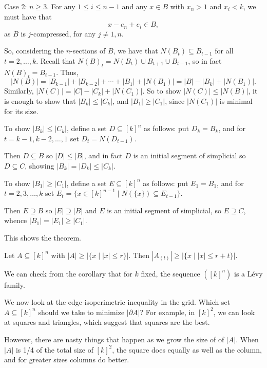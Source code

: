 \documentclass[12pt]{article}
\begin{document}
\begin{proofbox}
	Case 2: $n \geq 3$. For any $1 \leq i \leq n-1$ and any $x \in B$ with $x_n > 1$ and $x_i < k$, we must have that
	\[
	x - e_n + e_i \in B,
	\]
	as $B$ is $j$-compressed, for any $j \neq 1, n$.

	So, considering the $n$-sections of $B$, we have that $N(B_t) \subseteq B_{t-1}$ for all $t = 2, \ldots, k$. Recall that $N(B)_t = N(B_t) \cup B_{t+1} \cup B_{t-1}$, so in fact $N(B)_t = B_{t-1}$. Thus,
	\[
	|N(B)| = |B_{k-1}| + |B_{k-2}| + \cdots + |B_1| + |N(B_1)| = |B| - |B_k| + |N(B_1)|.
	\]
	Similarly, $|N(C)| = |C| - |C_k| + |N(C_1)|$. So to show $|N(C)| \leq |N(B)|$, it is enough to show that $|B_k| \leq |C_k|$, and $|B_1| \geq |C_1|$, since $|N(C_1)|$ is minimal for its size.

	To show $|B_k| \leq |C_k|$, define a set $D \subseteq [k]^{n}$  as follows: put $D_k = B_k$, and for $t = k-1, k-2, \ldots, 1$ set $D_t = N(D_{t-1})$.

	Then $D \subseteq B$ so $|D| \leq |B|$, and in fact $D$ is an initial segment of simplicial so $D \subseteq C$, showing $|B_k| = |D_k| \leq |C_k|$.

	To show $|B_1| \geq |C_1|$, define a set $E \subseteq [k]^{n}$ as follows: put $E_1 = B_1$, and for $t = 2, 3, \ldots, k$ set $E_t = \{x \in [k]^{n-1} \mid N(\{x\}) \subseteq E_{t-1}\}$.

	Then $E \supseteq B$ so $|E| \supseteq |B|$ and $E$ is an initial segment of simplicial, so $E \supseteq C$, whence $|B_1| = |E_1| \geq |C_1|$.

	This shows the theorem.
\end{proofbox}

\begin{corollary}
	Let $A \subseteq [k]^{n}$ with $|A| \geq |\{x \mid |x| \leq r\}|$. Then $|A_{(t)}| \geq |\{x \mid |x| \leq r + t\}|$.
\end{corollary}

\begin{remark}
	We can check from the corollary that for $k$ fixed, the sequence $([k]^{n})$ is a L\'evy family.
\end{remark}

We now look at the edge-isoperimetric inequality in the grid. Which set $A \subseteq [k]^{n}$ should we take to minimize $|\partial A|$? For example, in $[k]^2$, we can look at squares and triangles, which suggest that squares are the best.

However, there are nasty things that happen as we grow the size of of $|A|$. When $|A|$ is 1/4 of the total size of $[k]^2$, the square does equally as well as the column, and for greater sizes columns do better.
\end{document}
